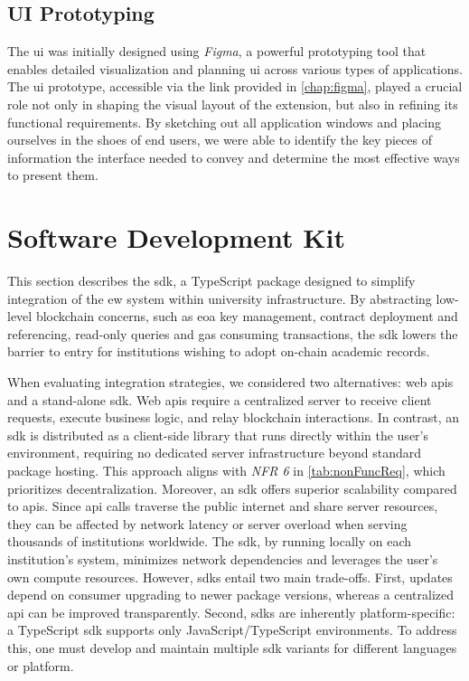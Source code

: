 \subsection{UI Prototyping}
The \acrlong{ui} was initially designed using \textit{Figma}, a powerful prototyping tool that enables detailed visualization and planning \acrlong{ui} across various types of applications. The \acrshort{ui} prototype, accessible via the link provided in \cref{chap:figma}, played a crucial role not only in shaping the visual layout of the extension, but also in refining its functional requirements. 
By sketching out all application windows and placing ourselves in the shoes of end users, we were able to identify the key pieces of information the interface needed to convey and determine the most effective ways to present them. 

\section{Software Development Kit}
\label{sec:sdkDesign}
This section describes the \acrlong{sdk}, a TypeScript package designed to simplify integration of the \acrlong{ew} system within university infrastructure. By abstracting low-level blockchain concerns, such as \acrshort{eoa} key management, contract deployment and referencing, read-only queries and gas consuming transactions, the \acrshort{sdk} lowers the barrier to entry for institutions wishing to adopt on-chain academic records.

When evaluating integration strategies, we considered two alternatives: web \acrshort{api}s and a stand-alone \acrshort{sdk}. Web \acrshort{api}s require a centralized server to receive client requests, execute business logic, and relay blockchain interactions. In contrast, an \acrshort{sdk} is distributed as a client-side library that runs directly within the user's environment, requiring no dedicated server infrastructure beyond standard package hosting. This approach aligns with \textit{NFR 6} in \cref{tab:nonFuncReq}, which prioritizes decentralization.
Moreover, an \acrshort{sdk} offers superior scalability compared to \acrshort{api}s. Since \acrshort{api} calls traverse the public internet and share server resources, they can be affected by network latency or server overload when serving thousands of institutions worldwide. The \acrshort{sdk}, by running locally on each institution's system, minimizes network dependencies and leverages the user's own compute resources.
However, \acrshort{sdk}s entail two main trade-offs. First, updates depend on consumer upgrading to newer package versions, whereas a centralized \acrshort{api} can be improved transparently. Second, \acrshort{sdk}s are inherently platform-specific: a TypeScript \acrshort{sdk} supports only JavaScript/TypeScript environments. To address this, one must develop and maintain multiple \acrshort{sdk} variants for different languages or platform.

